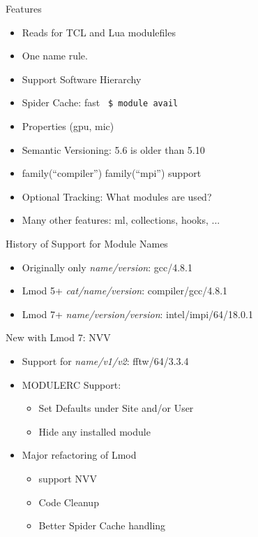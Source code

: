 \documentclass{beamer}
\begin{document}
\begin{frame}{Features}
  \begin{itemize}
    \item Reads for TCL and Lua modulefiles
    \item One name rule.
    \item Support Software Hierarchy
    \item Spider Cache: fast \texttt{\color{blue} \$ module avail}
    \item Properties (gpu, mic)
    \item Semantic Versioning:  5.6 is older than 5.10
    \item family(``compiler'') family(``mpi'') support
    \item Optional Tracking: What modules are used?
    \item Many other features: ml, collections, hooks, ...
  \end{itemize}
\end{frame}

\begin{frame}{History of Support for Module Names}
  \begin{itemize}
    \item Originally only \emph{name/version}:  gcc/4.8.1
    \item Lmod 5+ \emph{cat/name/version}:  compiler/gcc/4.8.1
    \item Lmod 7+ \emph{name/version/version}: intel/impi/64/18.0.1
  \end{itemize}
\end{frame}

\begin{frame}{New with Lmod 7: NVV}
  \begin{itemize}
    \item Support for \emph{name/v1/v2}:  fftw/64/3.3.4
    \item MODULERC Support:
      \begin{itemize}
        \item Set Defaults under Site and/or User
        \item Hide any installed module
      \end{itemize}
    \item Major refactoring of Lmod 
      \begin{itemize}
        \item support NVV
        \item Code Cleanup
        \item Better Spider Cache handling
      \end{itemize}
  \end{itemize}
\end{frame}
\end{document}
